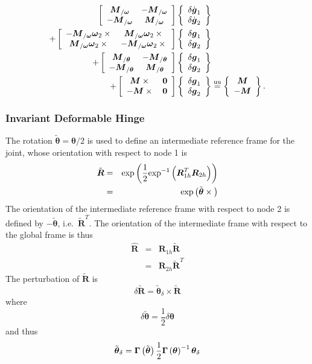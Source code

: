 \documentclass[10pt,dvips,fleqn]{report}
\newcommand{\T}[1]{\boldsymbol{#1}}
\newcommand{\equu}{\overset{\mathrm{uu}}{=}}
\begin{document}
\begin{align}
	\sqbr{\matr{cc}{
		\T{M}_{/\T{\omega}} & - \T{M}_{/\T{\omega}} \\
		- \T{M}_{/\T{\omega}} & \T{M}_{/\T{\omega}}
	}}\cubr{\cvvect{
		\delta\dot{\T{g}}_1 \\
		\delta\dot{\T{g}}_2
	}} & \nonumber \\
	+ \sqbr{\matr{cc}{
		- \T{M}_{/\T{\omega}} \T{\omega}_2 \times{} & \T{M}_{/\T{\omega}} \T{\omega}_2 \times{} \\
		\T{M}_{/\T{\omega}} \T{\omega}_2 \times{} & - \T{M}_{/\T{\omega}} \T{\omega}_2 \times{}
	}} \cubr{\cvvect{
		\delta\T{g}_1 \\
		\delta\T{g}_2 
	}} & \nonumber \\
	+ \sqbr{\matr{cc}{
		\T{M}_{/\T{\theta}} & - \T{M}_{/\T{\theta}} \\
		- \T{M}_{/\T{\theta}} & \T{M}_{/\T{\theta}}
	}} \cubr{\cvvect{
		\delta\T{g}_1 \\
		\delta\T{g}_2 
	}} & \nonumber \\
	+ \sqbr{\matr{cc}{
		\T{M}\times{} & \T{0} \\
		- \T{M}\times{} & \T{0}
	}} \cubr{\cvvect{
		\delta\T{g}_1 \\
		\delta\T{g}_2 
	}} &\equu \cubr{\cvvect{
		\T{M} \\
		- \T{M}
	}} .
\end{align}


\subsubsection{Invariant Deformable Hinge}
\label{sec:deformable-hinge-invariant}
The rotation $\tilde{\T{\theta}}=\T{\theta}/2$
is used to define an intermediate reference frame for the joint,
whose orientation with respect to node 1 is
\begin{eqnarray}
	\tilde{\T{R}} & = & \llk{exp}\plbr{\frac{1}{2}\llk{exp}^{-1}\plbr{\T{R}_{1h}^T \T{R}_{2h}}} \\
		& = & \llk{exp}\plbr{\tilde{\T{\theta}}\times{}}
\end{eqnarray}
The orientation of the intermediate reference frame with respect 
to node 2 is defined by $-\tilde{\T{\theta}}$, i.e.\ $\tilde{\T{R}}^T$.
The orientation of the intermediate frame with respect
to the global frame is thus
\begin{eqnarray}
	\hat{\T{R}} & = & \T{R}_{1h} \tilde{\T{R}}
		\label{eq:inv-def-h-hatR-1} \\
	& = & \T{R}_{2h} \tilde{\T{R}}^T
		\label{eq:inv-def-h-hatR-2}
\end{eqnarray}
The perturbation of $\tilde{\T{R}}$ is
\begin{equation}
	\delta\tilde{\T{R}} = \tilde{\T{\theta}}_{\delta}\times\tilde{\T{R}}
\end{equation}
where
\begin{equation}
	\delta\tilde{\T{\theta}} = \frac{1}{2} \delta \T{\theta}
\end{equation}
and thus
\begin{equation}
	\tilde{\T{\theta}}_{\delta} = \T{\Gamma}\plbr{\tilde{\T{\theta}}} \frac{1}{2} \T{\Gamma}\plbr{\T{\theta}}^{-1} \T{\theta}_{\delta} 
\end{equation}
\end{document}
